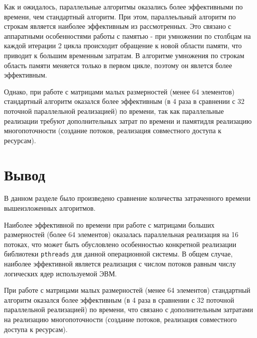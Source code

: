 Как и ожидалось, параллельные алгоритмы оказались более эффективными по времени, чем стандартный алгоритм. При этом, параллеьльный алгоритм по строкам является наиболее эффективным из рассмотренных. Это связано с аппаратными особенностями работы с памятью - при умножении по столбцам на каждой итерации 2 цикла происходит обращение к новой области памяти, что приводит к большим временным затратам. В алгоритме умножения по строкам область памяти меняется только в первом цикле, поэтому он явлется более эффективным.

Однако, при работе с матрицами малых размерностей (менее 64 элементов) стандартный алгоритм оказался более эффективным (в 4 раза в сравнении с 32 поточной параллельной реализацией) по времени, так как параллельные реализации требуют дополнительных затрат по времени и памятидля  реализацию многопоточности (создание потоков, реализация совместного доступа к ресурсам).

\section{Вывод}
В данном разделе было произведено сравнение количества затраченного вре­мени вышеизложенных алгоритмов.

Наиболее эффективной по времени при работе с матрицами больших размерностей (более 64 элементов) оказалась параллельная реализация на 16 потоках, что может быть обусловлено особенностью конкретной реализации библиотеки \texttt{pthreads} \cite{pthread} для данной операционной системы. В общем случае, наиболее эффективной является реализация с числом потоков равным числу логических ядер используемой ЭВМ.

При работе с матрицами малых размерностей (менее 64 элементов) стандартный алгоритм оказался более эффективным (в 4 раза в сравнении с 32 поточной параллельной реализацией) по времени, что связано с дополнительным затратами на реализацию многопоточности (создание потоков, реализация совместного доступа к ресурсам).